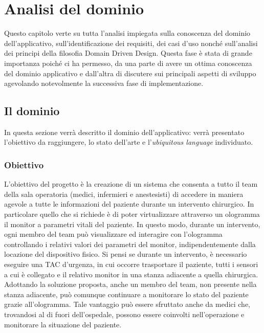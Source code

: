 
\chapter{Analisi del dominio}
Questo capitolo verte su tutta l'analisi impiegata sulla conoscenza del dominio dell'applicativo, sull'identificazione dei requisiti, dei casi d'uso nonché sull'analisi dei principi della filosofia Domain Driven Design. \newline \newline Questa fase è stata di grande importanza poiché ci ha permesso, da una parte di avere un ottima conoscenza del dominio applicativo e dall'altra di discutere sui principali aspetti di sviluppo agevolando notevolmente la successiva fase di implementazione.

\section{Il dominio}
In questa sezione verrà descritto il dominio dell'applicativo: verrà presentato l'obiettivo da raggiungere, lo stato dell'arte e l'\textit{ubiquitous language} individuato.
 
\subsection{Obiettivo}

L’obiettivo del progetto è la creazione di un sistema che consenta a tutto il team della sala operatoria (medici, infermieri e anestesisti) di accedere in maniera agevole a tutte le informazioni del paziente durante un intervento chirurgico. In particolare quello che si richiede è di poter virtualizzare attraverso un ologramma il monitor a parametri vitali del paziente. In questo modo, durante un intervento, ogni membro del team può visualizzare ed interagire con l'ologramma controllando i relativi valori dei parametri del monitor, indipendentemente dalla locazione del dispositivo fisico. Si pensi se durante un intervento, è necessario eseguire una TAC d'urgenza, in cui occorre trasportare il paziente, tutti i sensori a cui è collegato e il relativo monitor in una stanza adiacente a quella chirurgica. Adottando la soluzione proposta, anche un membro del team, non presente nella stanza adiacente, può comunque continuare a monitorare lo stato del paziente grazie all'ologramma. Tale vantaggio può essere sfruttato anche da medici che, trovandosi al di fuori dell'ospedale, possono essere coinvolti nell’operazione e monitorare la situazione del paziente. 

